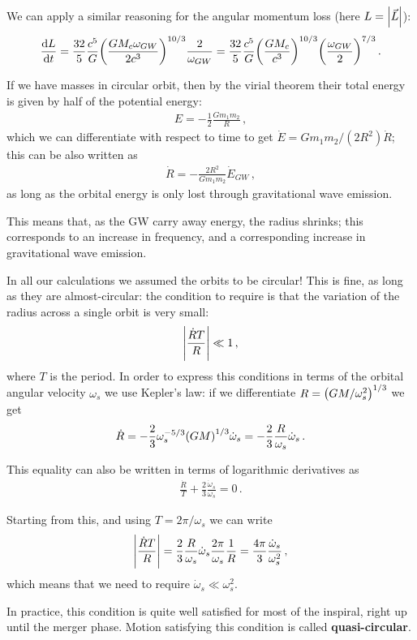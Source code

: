 \documentclass[main.tex]{subfiles}
\begin{document}
We can apply a similar reasoning for the angular momentum loss (here \(L = \abs{\vec{L}}\)): 
%
\begin{align}
\dv{L}{t} = 
\frac{32}{5} \frac{c^{5}}{G} \qty( \frac{G M_c \omega_{GW}}{2 c^{3}})^{10/3} \frac{2}{\omega_{GW}}
= \frac{32}{5} \frac{c^{5}}{G} \qty(\frac{G M_c}{c^{3}})^{10/3} \qty(\frac{\omega_{GW}}{2})^{7/3}
\,.
\end{align}

If we have masses in circular orbit, then by the virial theorem their total energy is given by half of the potential energy: 
%
\begin{align}
E = - \frac{1}{2} \frac{G m_1 m_2  }{R}
\,,
\end{align}
%
which we can differentiate with respect to time to get \(\dot{E} = G m_1 m_2 / (2 R^2) \dot{R}\); this can be also written as
%
\begin{align} \label{eq:radius-evolution-binary}
\dot{R} = - \frac{2R^2}{G m_1 m_2 } \dot{E}_{GW}
\,,
\end{align}
%
as long as the orbital energy is only lost through gravitational wave emission. 

This means that, as the GW carry away energy, the radius shrinks; this corresponds to an increase in frequency, and a corresponding increase in gravitational wave emission. 

In all our calculations we assumed the orbits to be circular!
This is fine, as long as they are almost-circular: the condition to require is that the variation of the radius across a single orbit is very small: 
%
\begin{align}
\abs{\frac{\dot{R} T}{R}} \ll 1
\,,
\end{align}
%
where \(T\) is the period.
In order to express this conditions in terms of the orbital angular velocity \(\omega_{s}\) we use Kepler's law: if we differentiate \(R = \qty(GM / \omega_{s}^2)^{1/3}\) we get 
%
\begin{align} \label{eq:derivative-radius-evolution-binary}
\dot{R} = - \frac{2}{3} \omega_{s}^{-5/3} \qty(GM)^{1/3} \dot{\omega}_{s}
= - \frac{2}{3} \frac{R}{\omega_{s}} \dot{\omega}_{s}
\,.
\end{align}

This equality can also be written in terms of logarithmic derivatives as 
%
\begin{align}
\frac{\dot{R}}{T} + \frac{2}{3} \frac{\dot{\omega}_{s}}{\omega_{s}} = 0
\,.
\end{align}

Starting from this, and using \(T = 2 \pi / \omega_{s}\) we can write 
%
\begin{align}
\abs{\frac{\dot{R}T}{R}} = \frac{2}{3} \frac{R}{\omega_{s}} \dot{\omega}_{s} \frac{2\pi}{\omega_{s}} \frac{1}{R} = \frac{4 \pi }{3} \frac{\dot{\omega}_{s}}{\omega_{s}^2} 
\,,
\end{align}
% 
which means that we need to require \(\dot{\omega}_{s} \ll \omega_{s}^2\).

In practice, this condition is quite well satisfied for most of the inspiral, right up until the merger phase. 
Motion satisfying this condition is called \textbf{quasi-circular}. 
\end{document}
